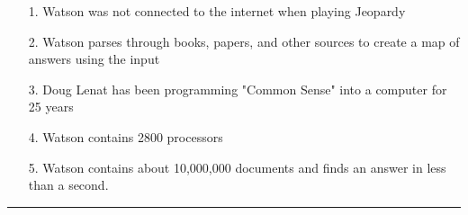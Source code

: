 \documentclass[a4paper, 11pt]{article}
\begin{document}
\begin{itemize}
\item[1.] Watson was not connected to the internet when playing Jeopardy
\item[2.] Watson parses through books, papers, and other sources to create a map of answers using the input
\item[3.] Doug Lenat has been programming "Common Sense" into a computer for 25 years 
\item[4.] Watson contains 2800 processors
\item[5.] Watson contains about 10,000,000 documents and finds an answer in less than a second.
\end{itemize}

\noindent\rule{16cm}{0.4pt}\\
\\
\end{document}
